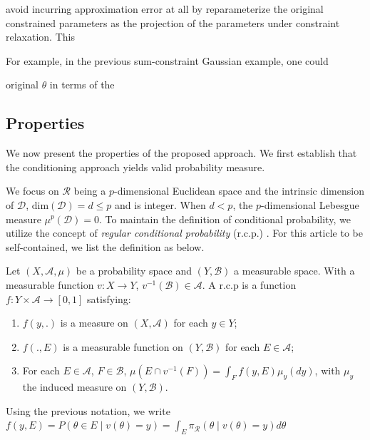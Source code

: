 \documentclass[10pt]{article}
\newcommand{\mc}[1]{\mathcal{#1}}
\DeclareMathOperator{\1}{\mathbbm{1}}
\begin{document}
avoid incurring approximation error at all by reparameterize the original constrained
parameters as the projection of the parameters under constraint
relaxation. This 

For example, in the previous sum-constraint Gaussian example, one could


original $\theta$ in terms of the 


\subsection{Properties}

We now present the properties of the proposed approach. We first establish
that the conditioning approach yields valid probability measure.

We focus on $\mc R$ being a $p$-dimensional Euclidean space and the
intrinsic dimension of $\mc D$, $\mbox{dim}(\mc D)=d\le p$ and is integer.
When $d<p$, the
$p$-dimensional Lebesgue measure $\mu^p(\mc D)=0$. To maintain the definition
of conditional probability, we utilize the concept of {\it regular
conditional probability} (r.c.p.)
\citep{kolmogorov1950foundations}. For this article to be self-contained,
we list the definition \citep{leao2004regular} as below.

Let $(X, \mathscr A, \mu)$ be a probability space and $(Y, \mathscr B)$ a measurable space. With a measurable function $v:X\rightarrow Y$, $v^{-1}(\mathscr B)\in \mathscr A$.
A r.c.p is a function
$f: Y\times \mathscr A \rightarrow[0,1]$ satisfying:

\begin{enumerate}
	\item $f(y, .)$ is a measure on $(X,\mathscr A)$ for each $y \in
	Y$;
	\item $f(., E)$ is a measurable function on $(Y,\mathscr B)$ for each $E\in \mathscr A$;
	\item For each $E \in \mathscr A$, $F\in \mathscr B$,
	$\mu(E \cap v^{-1}(F))=\int_{F} f(y, E) \mu_y(dy)$, with
	$\mu_y$ the induced measure on $(Y,\mathscr B)$.
\end{enumerate}

Using the previous notation, we write $f(y,E)= P(\theta\in E\mid
v(\theta)=y)=\int_E \pi_{\mc R}(\theta
\mid v(\theta)=y) d\theta$
\end{document}

